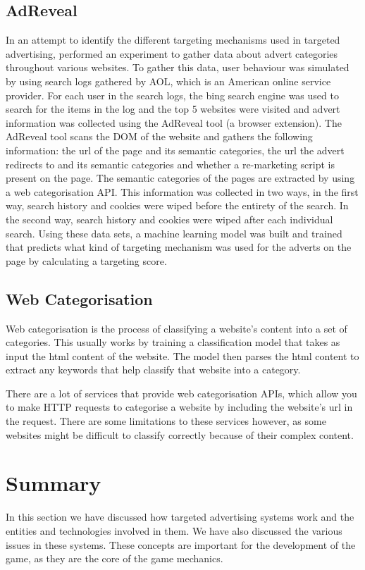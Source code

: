 \documentclass{l4proj}
\begin{document}
\subsection{AdReveal}
In an attempt to identify the different targeting mechanisms used in targeted advertising, \cite{Liu2013} performed an experiment to gather data about advert categories throughout various websites. To gather this data, user behaviour was simulated by using search logs gathered by AOL, which is an American online service provider. 
For each user in the search logs, the bing search engine was used to search for the items in the log and the top 5 websites were visited and advert information was collected using the AdReveal tool (a browser extension). The AdReveal tool scans the DOM of the website and gathers the following information: the url of the page and its semantic categories, the url the advert redirects to and its semantic categories and whether a re-marketing script is present on the page. The semantic categories of the pages are extracted by using a web categorisation API. 
This information was collected in two ways, in the first way, search history and cookies were wiped before the entirety of the search. In the second way, search history and cookies were wiped after each individual search. Using these data sets, a machine learning model was built and trained that predicts what kind of targeting mechanism was used for the adverts on the page by calculating a targeting score.

\subsection{Web Categorisation}
Web categorisation is the process of classifying a website's content into a set of categories. This usually works by training a classification model that takes as input the html content of the website. The model then parses the html content to extract any keywords that help classify that website into a category. 

There are a lot of services that provide web categorisation APIs, which allow you to make HTTP requests to categorise a website by including the website's url in the request. There are some limitations to these services however, as some websites might be difficult to classify correctly because of their complex content.

\section{Summary}
In this section we have discussed how targeted advertising systems work and the entities and technologies involved in them. We have also discussed the various issues in these systems. These concepts are important for the development of the game, as they are the core of the game mechanics. 
\end{document}
